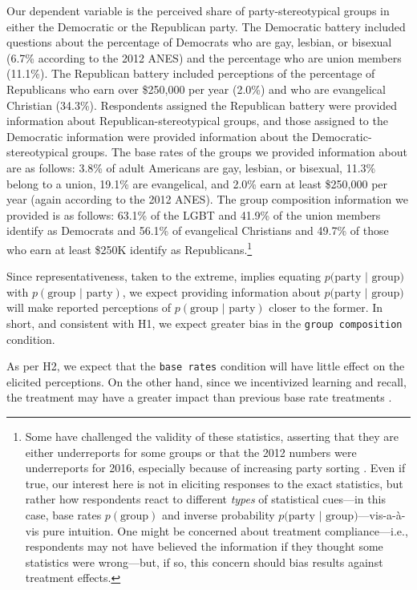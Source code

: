 \documentclass[12pt, letterpaper]{article}
\begin{document}
Our dependent variable is the perceived share of party-stereotypical groups in either the Democratic or the Republican party. The Democratic battery included questions about the percentage of Democrats who are gay, lesbian, or bisexual (6.7\% according to the 2012 ANES) and the percentage who are union members (11.1\%). The Republican battery included perceptions of the percentage of Republicans who earn over \$250,000 per year (2.0\%) and who are evangelical Christian (34.3\%). Respondents assigned the Republican battery were provided information about Republican-stereotypical groups, and those assigned to the Democratic information were provided information about the Democratic-stereotypical groups. The base rates of the groups we provided information about are as follows: 3.8\% of adult Americans are gay, lesbian, or bisexual, 11.3\% belong to a union, 19.1\% are evangelical, and 2.0\% earn at least \$250,000 per year (again according to the 2012 ANES). The group composition information we provided is as follows: 63.1\% of the LGBT and 41.9\% of the union members identify as Democrats and 56.1\% of evangelical Christians and 49.7\% of those who earn at least \$250K identify as Republicans.\footnote{Some have challenged the validity of these statistics, asserting that they are either underreports for some groups or that the 2012 numbers were underreports for 2016, especially because of increasing party sorting \citep[e.g.,][]{Levendusky2009}. Even if true, our interest here is not in eliciting responses to the exact statistics, but rather how respondents react to different \emph{types} of statistical cues---in this case, base rates $p(\text{group})$ and inverse probability $p\text{(party | group)}$---vis-a-\`{a}-vis pure intuition. One might be concerned about treatment compliance---i.e., respondents may not have believed the information if they thought some statistics were wrong---but, if so, this concern should bias results against treatment effects.}

Since representativeness, taken to the extreme, implies equating $p\text{(party | group)}$ with $p(\text{group | party})$, we expect providing information about $p\text{(party | group)}$ will make reported perceptions of $p(\text{group | party})$ closer to the former. In short, and consistent with H1, we expect greater bias in the {\tt group composition} condition. 

As per H2, we expect that the {\tt base rates} condition will have little effect on the elicited perceptions. On the other hand, since we incentivized learning and recall, the treatment may have a greater impact than previous base rate treatments \citep[e.g.,][]{ahler2018parties}. 
\end{document}
